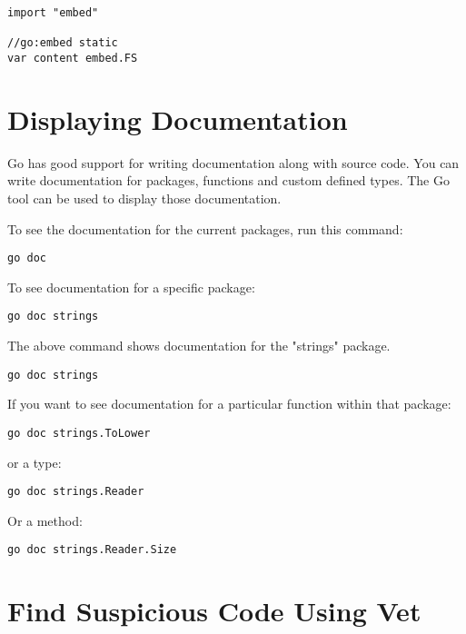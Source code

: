 \begin{lstlisting}[numbers=none]
import "embed"

//go:embed static
var content embed.FS
\end{lstlisting}

\section{Displaying Documentation}

Go has good support for writing documentation along with source
code.  You can write documentation for packages,
functions and custom defined types.  The Go tool can be used to
display those documentation.

To see the documentation for the current packages, run this command:

\begin{lstlisting}[numbers=none]
go doc
\end{lstlisting}

To see documentation for a specific package:

\begin{lstlisting}[numbers=none]
go doc strings
\end{lstlisting}

The above command shows documentation for the "strings" package.

\begin{lstlisting}[numbers=none]
go doc strings
\end{lstlisting}

If you want to see documentation for a particular function within that
package:

\begin{lstlisting}[numbers=none]
go doc strings.ToLower
\end{lstlisting}

or a type:

\begin{lstlisting}[numbers=none]
go doc strings.Reader
\end{lstlisting}

Or a method:

\begin{lstlisting}[numbers=none]
go doc strings.Reader.Size
\end{lstlisting}

\section{Find Suspicious Code Using Vet}

